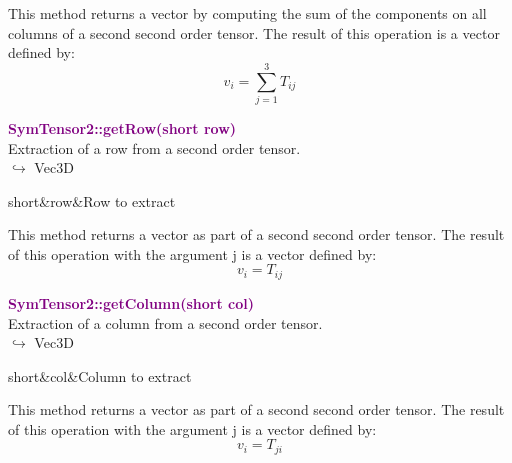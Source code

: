This method returns a vector by computing the sum of the components on all columns of a second second order tensor.
The result of this operation is a vector defined by:
\begin{equation*}
v_{i}=\sum_{j=1}^{3}T_{ij}
\end{equation*}

\textcolor{purple}{\textbf{SymTensor2::getRow(short row)}}\label{SymTensor2::getRow(short row)}\\
Extraction of a row from a second order tensor.\\ \hspace*{10mm}$\hookrightarrow$ Vec3D

\begin{tcolorbox}[width=\textwidth,myArgs,tabularx={ll|R},title=Arguments of SymTensor2::getRow]
short&row&Row to extract
\end{tcolorbox}

This method returns a vector as part of a second second order tensor.
The result of this operation with the argument j is a vector defined by:
\begin{equation*}
v_{i} = T_{ij}
\end{equation*}

\textcolor{purple}{\textbf{SymTensor2::getColumn(short col)}}\label{SymTensor2::getColumn(short col)}\\
Extraction of a column from a second order tensor.\\ \hspace*{10mm}$\hookrightarrow$ Vec3D

\begin{tcolorbox}[width=\textwidth,myArgs,tabularx={ll|R},title=Arguments of SymTensor2::getColumn]
short&col&Column to extract
\end{tcolorbox}

This method returns a vector as part of a second second order tensor.
The result of this operation with the argument j is a vector defined by:
\begin{equation*}
v_{i} = T_{ji}
\end{equation*}

